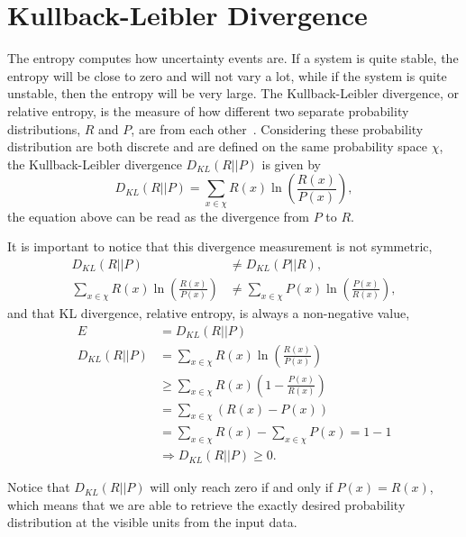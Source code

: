 \section{Kullback-Leibler Divergence}%
\label{app:dkl:dkl}%

The entropy computes how uncertainty events are.
If a system is quite stable, the entropy will be close to zero and will not vary a lot, while if the system is quite unstable, then the entropy will be very large.
The Kullback-Leibler divergence, or relative entropy, is the measure of how different two separate probability distributions, $R$ and $P$, are from each other~\cite{bib:goodfellow2016}. Considering these probability distribution are both discrete and are defined on the same probability space $\chi$, the Kullback-Leibler divergence $D_{KL}(R || P)$ is given by
\begin{equation}
  \label{eq:app-dkl}
  D_{KL}(R || P) = \sum_{x \in \chi} R(x) \ln \left(\frac{R(x)}{P(x)} \right),
\end{equation}
the equation above can be read as the divergence from $P$ to $R$.

It is important to notice that this divergence measurement is not symmetric,
\begin{equation}
  \label{eq:app-dkl-nonsymmetric}
  \begin{split}
    D_{KL}(R||P) & \neq D_{KL}(P||R), \\
    \sum_{x \in \chi} R(x) \ln \left(\frac{R(x)}{P(x)} \right) & \neq \sum_{x \in \chi} P(x) \ln \left(\frac{P(x)}{R(x)} \right),
  \end{split}
\end{equation}
and that KL divergence, relative entropy, is always a non-negative value, 
\begin{equation}
  \label{eq:app-dkl-nonnegative}
  \begin{split}
    E & = D_{KL}(R||P) \\
    D_{KL}(R||P) & = \sum_{x \in \chi} R(x) \ln{\left( \frac{R(x)}{P(x)} \right)} \\
    & \geq \sum_{x \in \chi} R(x) \left( 1 - \frac{P(x)}{R(x)} \right) \\
    & = \sum_{x \in \chi} \left( R(x) - P(x) \right) \\
    & = \sum_{x \in \chi} R(x) - \sum_{x \in \chi} P(x) = 1 - 1 \\
    & \Rightarrow D_{KL}(R||P) \geq 0.
  \end{split}
\end{equation}

Notice that $D_{KL}(R||P)$ will only reach zero if and only if $P(x) = R(x)$, which means that we are able to retrieve the exactly desired probability distribution at the visible units from the input data.
